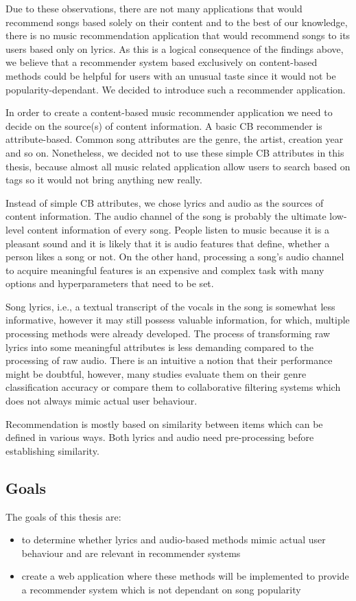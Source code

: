 Due to these observations, there are not many applications that would recommend songs based solely on their content and to the best of our knowledge, there is no music recommendation application that would recommend songs to its users based only on lyrics. As this is a logical consequence of the findings above, we believe that a recommender system based exclusively on content-based methods could be helpful for users with an unusual taste since it would not be popularity-dependant. We decided to introduce such a recommender application. 

In order to create a content-based music recommender application we need to decide on the source(s) of content information. A basic CB recommender is attribute-based. Common song attributes are the genre, the artist, creation year and so on. Nonetheless, we decided not to use these simple CB attributes in this thesis, because almost all music related application allow users to search based on tags so it would not bring anything new really. 

Instead of simple CB attributes, we chose lyrics and audio as the sources of content information. The audio channel of the song is probably the ultimate low-level content information of every song. People listen to music because it is a pleasant sound and it is likely that it is audio features that define, whether a person likes a song or not. On the other hand, processing a song's audio channel to acquire meaningful features is an expensive and complex task with many options and hyperparameters that need to be set.

Song lyrics, i.e., a textual transcript of the vocals in the song is somewhat less informative, however it may still possess valuable information, for which, multiple processing methods were already developed. The process of transforming raw lyrics into some meaningful attributes is less demanding compared to the processing of raw audio. There is an intuitive a notion that their performance might be doubtful, however, many studies evaluate them on their genre classification accuracy \cite{DBLP:journals/corr/Tsaptsinos17} or compare them to collaborative filtering systems \cite{Gossi2016LyricBasedMR} which does not always mimic actual user behaviour.

Recommendation is mostly based on similarity between items which can be defined in various ways. Both lyrics and audio need pre-processing before establishing similarity. 

\subsection*{Goals}
The goals of this thesis are:
\begin{itemize}
    \item to determine whether lyrics and audio-based methods mimic actual user behaviour and are relevant in recommender systems
    \item create a web application where these methods will be implemented to provide a recommender system which is not dependant on song popularity
\end{itemize}

